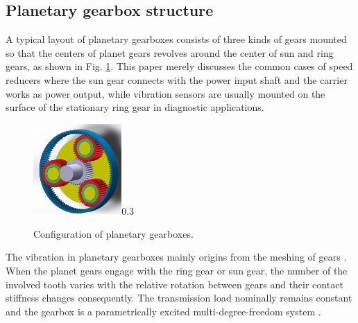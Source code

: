 \documentclass[a4paper]{cas-sc}%
\begin{document}
\subsection{Planetary gearbox structure}
\par A typical layout of planetary gearboxes consists of three kinds of gears mounted so that the centers of planet gears revolves around the center of sun and ring gears, as shown in Fig. \ref{fig:planetary_gearbox_layout}. This paper merely discusses the common cases of speed reducers where the sun gear connects with the power input shaft and the carrier works as power output, while vibration sensors are usually mounted on the surface of the stationary ring gear in diagnostic applications. 
\begin{figure}[pos=htbp]
    \centering
    \begin{annotate}{\includegraphics[width=0.3\textwidth]{Planetary_Gearbox.PNG}}{0.3}
    \end{annotate}
    \caption{Configuration of planetary gearboxes.}
    \label{fig:planetary_gearbox_layout}
\end{figure}
\par The vibration in planetary gearboxes mainly origins from the meshing of gears \cite{Velex1996}. When the planet gears engage with the ring gear or sun gear, the number of the involved tooth varies with the relative rotation between gears and their contact stiffness changes consequently. The transmission load nominally remains constant and the gearbox is a parametrically excited multi-degree-freedom system \cite{Acar2019}. 
\end{document}
